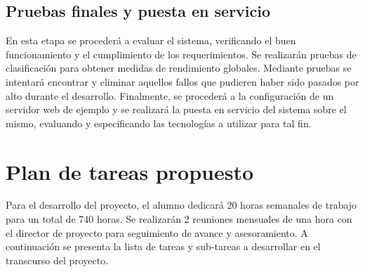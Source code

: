 \documentclass[12pt,bibliography=oldstyle,DIV=12,parskip=full-,titlepage]{scrartcl}
\begin{document}
\subsection{Pruebas finales y puesta en servicio}
En esta etapa se procederá a evaluar el sistema, verificando el buen
funcionamiento y el cumplimiento de los requerimientos. Se realizarán
pruebas de clasificación para obtener medidas de rendimiento
globales. Mediante pruebas se intentará encontrar y eliminar
aquellos fallos que pudieren haber sido pasados por alto durante el
desarrollo.
%
Finalmente, se procederá a la configuración de un servidor web de
ejemplo y se realizará la puesta en servicio del sistema sobre el
mismo, evaluando y especificando las tecnologías a utilizar para tal
fin.
%
%
\newpage
\section{Plan de tareas propuesto}
Para el desarrollo del proyecto, el alumno dedicará 20 horas semanales
de trabajo para un total de 740 horas.  Se realizarán 2
reuniones mensuales de una hora con el director de proyecto para
seguimiento de avance y asesoramiento.
%
A continuación se presenta la lista de tareas y sub-tareas a
desarrollar en el transcurso del proyecto.
\end{document}
